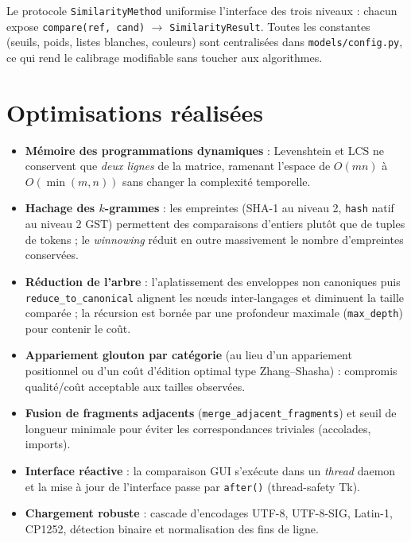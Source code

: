\documentclass[10pt,a4paper]{article}
\begin{document}
Le protocole \texttt{SimilarityMethod} uniformise l'interface des trois
niveaux : chacun expose \texttt{compare(ref, cand)} $\rightarrow$
\texttt{SimilarityResult}. Toutes
les constantes (seuils, poids, listes blanches, couleurs) sont centralisées
dans \texttt{models/config.py}, ce qui rend le calibrage modifiable sans
toucher aux algorithmes.

\section{Optimisations réalisées}

\begin{itemize}
  \item \textbf{Mémoire des programmations dynamiques} : Levenshtein et LCS ne
        conservent que \emph{deux lignes} de la matrice, ramenant l'espace de
        $O(mn)$ à $O(\min(m,n))$ sans changer la complexité temporelle.
  \item \textbf{Hachage des $k$-grammes} : les empreintes (SHA-1 au niveau 2,
        \texttt{hash} natif au niveau 2 GST) permettent des comparaisons
        d'entiers plutôt que de tuples de tokens ; le \emph{winnowing} réduit
        en outre massivement le nombre d'empreintes conservées.
  \item \textbf{Réduction de l'arbre} : l'aplatissement des enveloppes non
        canoniques puis \texttt{reduce\_to\_canonical} alignent les nœuds
        inter-langages et diminuent la taille comparée ; la récursion est bornée
        par une profondeur maximale (\texttt{max\_depth}) pour contenir le coût.
  \item \textbf{Appariement glouton par catégorie} (au lieu d'un appariement
        positionnel ou d'un coût d'édition optimal type Zhang--Shasha) :
        compromis qualité/coût acceptable aux tailles observées.
  \item \textbf{Fusion de fragments adjacents}
        (\texttt{merge\_adjacent\_fragments}) et seuil de longueur minimale
        pour éviter les correspondances triviales (accolades, imports).
  \item \textbf{Interface réactive} : la comparaison GUI s'exécute dans un
        \emph{thread} daemon et la mise à jour de l'interface passe par
        \texttt{after()} (thread-safety Tk).
  \item \textbf{Chargement robuste} : cascade d'encodages UTF-8, UTF-8-SIG,
        Latin-1, CP1252, détection binaire et normalisation des fins de ligne.
\end{itemize}
\end{document}
